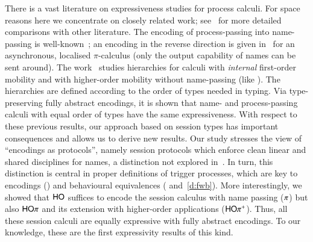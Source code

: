 There is a vast literature on expressiveness studies for process calculi. 
For space reasons here we concentrate on closely related work; 
see~\cite{KouzapasPY15} for more detailed comparisons with other literature. 
%
The encoding of process-passing into name-passing is well-known~\cite{SangiorgiD:expmpa};
an encoding in the reverse direction 
is given in~\cite{SaWabook} for an asynchronous, localised $\pi$-calculus
(only the output capability of names can be sent around).  The
work~\cite{San96int} studies hierarchies for calculi with
\emph{internal} first-order mobility and with higher-order mobility
without name-passing (like \HO). The
hierarchies are %
defined according to
the order of types needed in typing. 
Via type-preserving fully abstract encodings, it is shown that 
name- and process-passing calculi with equal order of types have the
same expressiveness.  With respect to these previous results, our
approach based on session types has important consequences and
allows us to derive new results.  
Our study stresses the 
view of ``encodings as protocols'', namely session protocols which
enforce clean linear and shared disciplines for names, a distinction
not explored in~\cite{SangiorgiD:expmpa,DBLP:journals/tcs/Sangiorgi01}. In
turn, this distinction is central in proper definitions
of trigger processes, which are key to encodings
() and behavioural equivalences
( and~\ref{d:fwb}).  More interestingly, we showed that
$\mathsf{HO}$ suffices to encode  the session
calculus with name passing ($\pi$) but also $\mathsf{HO}\pi$ and its extension with
higher-order applications ($\mathsf{HO\pi^{+}}$). 
Thus, %
all these session calculi are equally expressive with fully
abstract encodings.  To our knowledge, these are the first
expressivity results of this kind.

